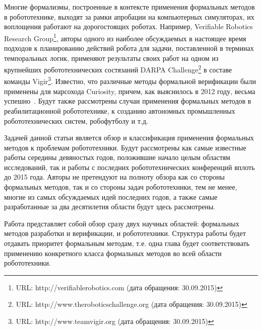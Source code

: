 \documentclass[a4, 14pt]{article}
\begin{document}
Многие формализмы, построенные в контексте применения формальных методов в 
робототехнике, выходят за рамки апробации на компьютерных симуляторах, их 
воплощения работают на дорогостоящих роботах. Например, Verifiable Robotics 
Research Group\footnote{URL: http://verifiablerobotics.com (дата обращения: 30.09.2015)}, 
авторы одного из наиболее обсуждаемых в настоящее время подходов 
к планированию действий робота для задачи, поставленной в терминах темпоральных 
логик, применяют результаты своих работ на одном из крупнейших робототехнических 
состязаний DARPA Challenge\footnote{URL: http://www.theroboticschallenge.org (дата обращения: 30.09.2015)} 
в составе команды Vigir\footnote{URL: http://www.teamvigir.org (дата обращения: 30.09.2015)}. 
Известно, что различные методы формальной верификации были применены для марсохода 
Curiosity, причем, как выяснилось в 2012 году, весьма успешно~\cite{kornfeld2014verification}.
Будут также рассмотрены случаи применения формальных методов в реабилитационной 
робототехнике, к созданию автономных промышленных робототехнических систем, 
робофутболу и т.д.

Задачей данной статьи является обзор и классификация применения формальных 
методов к проблемам робототехники. Будут рассмотрены как самые известные работы 
середины девяностых годов, положившие начало целым областям исследований, так и 
работы с последних робототехнических конференций вплоть до 2015 года. Авторы не 
претендуют на полноту обзора как со стороны формальных методов, так и со стороны 
задач робототехники, тем не менее, многие из самых обсуждаемых идей последних 
годов, а также самые разработанные за два десятилетия области будут здесь рассмотрены.

Работа представляет собой обзор сразу двух научных областей: формальных методов 
разработки и верификации, и робототехники. Структура работы будет отдавать 
приоритет формальным методам, т.е. одна глава будет соответствовать применению 
конкретного класса формальных методов во всей области робототехники. 
\end{document}
